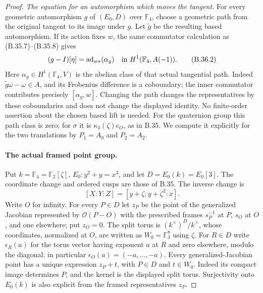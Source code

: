 \begin{proof}
\emph{The equation for an automorphism which moves the tangent.}
For every geometric automorphism $g$ of $(E_0,D)$ over
$\mathbb F_4$, choose a geometric path from the original
tangent to its image under $g$. Let $\widetilde g$ be the
resulting based automorphism. If its action fixes $w$, the
same commutator calculation as (B.35.7)--(B.35.8) gives
\[
 (g-I)[\eta]=\operatorname{ad}_{w*}(\alpha_g)
       \quad\hbox{in }H^1(\mathbb F_4,A(-1)).                \tag{B.36.2}
\]
Here $\alpha_g\in H^1(\mathbb F_4,V)$ is the abelian
class of that actual tangential path.
Indeed $\widetilde g\omega-\omega\in A$, and its
Frobenius difference is a coboundary; the inner
commutator contributes precisely $[\alpha_g,w]$.
Changing the path changes the representatives by these
coboundaries and does not change the displayed identity.
No finite-order assertion about the chosen based lift
is needed.
For the quaternion group this path class is zero;
for $\sigma$ it is $\kappa_3(\zeta)e_O$, as in B.35.
We compute it explicitly for the two translations by
$P_1=A_0$ and $P_2=A_2$.

\paragraph{The actual framed point group.}
Put $k=\mathbb F_4=\mathbb F_2[\zeta]$,
$E_0:y^2+y=x^3$, and let $D=E_0(k)=E_0[3]$.
The coordinate change and ordered cusps are those of B.35.
The inverse change is
\[
                  [X:Y:Z]=[y+\zeta:y+\zeta^2:x].
\]
Write $O$ for infinity.  For every $P\in D$ let $z_P$
be the point of the generalized Jacobian represented by
$\mathcal O(P-O)$ with the prescribed frames
$s_P^{-1}$ at $P$, $s_O$ at $O$, and one elsewhere;
put $z_O=0$.
The split torus is $(k^\times)^D/k^\times$, whose
coordinates, normalized at $O$, are written as
$W_0=\mathbb F_3^8$ using $\zeta$.
For $R\in D$ write $\epsilon_R(a)$ for the torus vector
having exponent $a$ at $R$ and zero elsewhere, modulo
the diagonal; in particular
$\epsilon_O(a)=(-a,\ldots,-a)$.
Every generalized-Jacobian point has a unique expression
$z_P+t$, with $P\in D$ and $t\in W_0$.
Indeed its compact image determines $P$, and the kernel
is the displayed split torus.  Surjectivity onto $E_0(k)$
is also explicit from the framed representatives $z_P$.


\end{proof}
